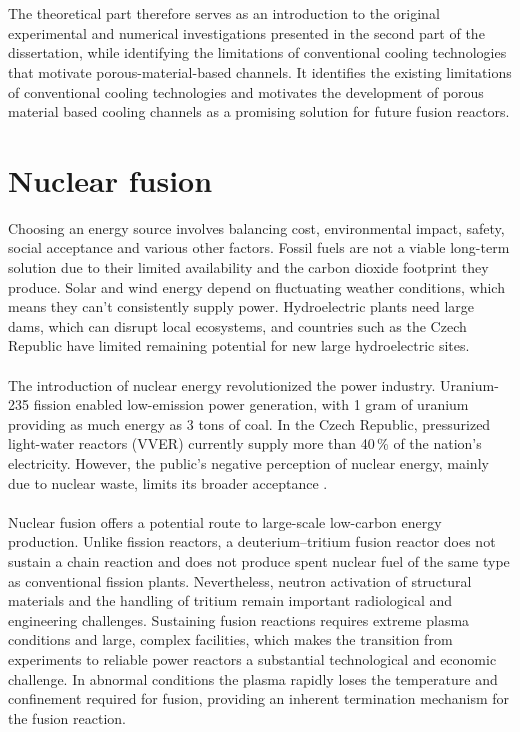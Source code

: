\documentclass[a4paper]{article}
\begin{document}
\\
\\
The theoretical part therefore serves as an introduction to the original experimental and numerical investigations presented in the second part of the dissertation, while identifying the limitations of conventional cooling technologies that motivate porous-material-based channels. It identifies the existing limitations of conventional cooling technologies and motivates the development of porous material based cooling channels as a promising solution for future fusion reactors.

\pagebreak

\section{Nuclear fusion}
Choosing an energy source involves balancing cost, environmental impact, safety, social acceptance and various other factors. 
Fossil fuels are not a viable long-term solution due to their limited availability and the carbon dioxide footprint they produce. 
Solar and wind energy depend on fluctuating weather conditions, which means they can't consistently supply power. 
Hydroelectric plants need large dams, which can disrupt local ecosystems, and countries such as the Czech Republic have limited remaining potential for new large hydroelectric sites.
\\
\\
The introduction of nuclear energy revolutionized the power industry. Uranium-235 fission enabled low-emission power generation, with 1 gram of uranium providing as much energy as 3 tons of coal. 
In the Czech Republic, pressurized light-water reactors (VVER) currently supply more than 40\,\% of the nation's electricity. 
However, the public's negative perception of nuclear energy, mainly due to nuclear waste, limits its broader acceptance \cite{Smolk2023zr}.
\\
\\
Nuclear fusion offers a potential route to large-scale low-carbon energy production. Unlike fission reactors, a deuterium--tritium fusion reactor does not sustain a chain reaction and does not produce spent nuclear fuel of the same type as conventional fission plants. Nevertheless, neutron activation of structural materials and the handling of tritium remain important radiological and engineering challenges. Sustaining fusion reactions requires extreme plasma conditions and large, complex facilities, which makes the transition from experiments to reliable power reactors a substantial technological and economic challenge. In abnormal conditions the plasma rapidly loses the temperature and confinement required for fusion, providing an inherent termination mechanism for the fusion reaction.
\end{document}
